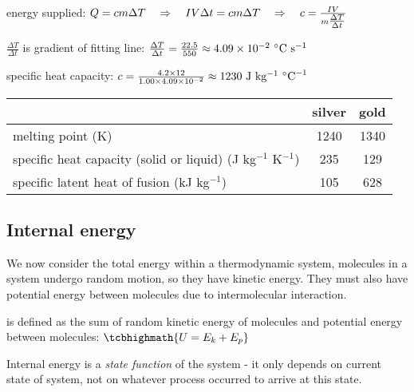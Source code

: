 \begin{soln} energy supplied: $Q = cm\Delta T \quad \Rightarrow \quad IV\Delta t = cm\Delta T \quad \Rightarrow \quad c = \frac{IV}{m \tfrac{\Delta T}{\Delta t}} $

$\frac{\Delta T}{\Delta t}$ is gradient of fitting line: $\frac{\Delta T}{\Delta t} = \frac{22.5}{550} \approx 4.09 \times 10^{-2} \text{ } \text{$^\circ\text{C}$} \text{ s}^{-1}$

specific heat capacity: $c = \frac{4.2\times12}{1.00 \times 4.09 \times 10^{-2}} \approx 1230 \text{ J kg$^{-1}$ $^\circ\text{C}^{-1}$}$	\end{soln}


\begin{center}
	\begin{tabular}{|l|c|c|}
		\hline  & silver & gold \\ 
		\hline melting point (K) & 1240 & 1340 \\ 
		\hline specific heat capacity (solid or liquid) (J kg$^{-1}$ K$^{-1}$) & 235 & 129 \\ 
		\hline specific latent heat of fusion (kJ kg$^{-1}$) & 105 & 628 \\
		\hline 
	\end{tabular} 
\end{center}



\subsection{Internal energy}

We now consider the total energy within a thermodynamic system, molecules in a system undergo random motion, so they have kinetic energy. They must also have potential energy between molecules due to intermolecular interaction.

\begin{ilight}
	 is defined as the sum of random kinetic energy of molecules and potential energy between molecules: $\tcbhighmath{U=E_k+E_p}$
\end{ilight}

Internal energy is a \emph{state function} of the system - it only depends on current state of system, not on whatever process occurred to arrive at this state.

